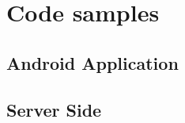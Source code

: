\chapter{Code samples}

\section{Android Application}

\section{Server Side}


\begin{verbatim}
 
\end{verbatim}


